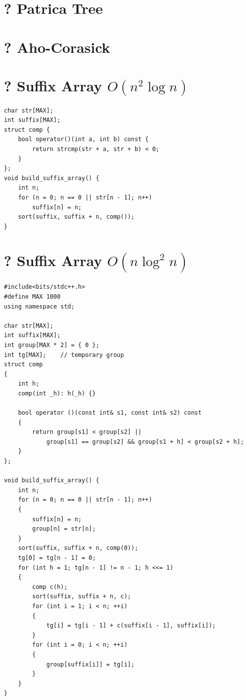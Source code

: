 \documentclass[12pt]{book}
\begin{document}
\section{? Patrica Tree}
\section{? Aho-Corasick}
\section{? Suffix Array $O(n^2\log n)$}
\begin{verbatim}
char str[MAX];
int suffix[MAX];
struct comp {
	bool operator()(int a, int b) const {
		return strcmp(str + a, str + b) < 0;
	}
};
void build_suffix_array() {
	int n;
	for (n = 0; n == 0 || str[n - 1]; n++)
		suffix[n] = n;
	sort(suffix, suffix + n, comp());
}
\end{verbatim}
\section{? Suffix Array $O(n\log^2 n)$}
\begin{verbatim}
#include<bits/stdc++.h>
#define MAX 1000
using namespace std;

char str[MAX];
int suffix[MAX];
int group[MAX * 2] = { 0 };
int tg[MAX];	// temporary group
struct comp
{
	int h;
	comp(int _h): h(_h) {}

	bool operator ()(const int& s1, const int& s2) const
	{
		return group[s1] < group[s2] ||
			group[s1] == group[s2] && group[s1 + h] < group[s2 + h];
	}
};

void build_suffix_array() {
	int n;
	for (n = 0; n == 0 || str[n - 1]; n++)
	{
		suffix[n] = n;
		group[n] = str[n];
	}
	sort(suffix, suffix + n, comp(0));
	tg[0] = tg[n - 1] = 0;
	for (int h = 1; tg[n - 1] != n - 1; h <<= 1)
	{
		comp c(h);
		sort(suffix, suffix + n, c);
		for (int i = 1; i < n; ++i)
		{
			tg[i] = tg[i - 1] + c(suffix[i - 1], suffix[i]);
		}
		for (int i = 0; i < n; ++i)
		{
			group[suffix[i]] = tg[i];
		}
	}
}
\end{verbatim}
\end{document}
